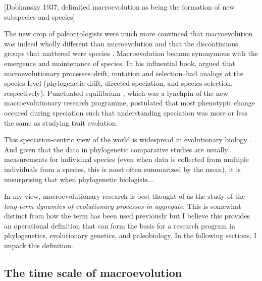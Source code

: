 [Dobhansky 1937, delimited macroevolution as being the formation of new subspecies and species]

The new crop of paleontologists were much more convinced that macroevolution was indeed wholly different than microevolution and that the discontinuous groups that mattered were species \citep{Stanley1975, Stanley1979, Gould1980, EldredgeCracraft1980, LiebermanTREE}. Macroevolution became synonymous with the emergence and maintenance of species. In his influential book, \citet{Stanley1979} argued that microevolutionary processes--drift, mutation and selection--had analogs at the species level (phylogenetic drift, directed speciation, and species selection, respectively). Punctuated equilibrium \citep{Eldredge1971, EldredgeGould1972, GouldEldredge1977}, which was a lynchpin of the new macroevolutionary research programme, postulated that most phenotypic change occured during speciation such that understanding speciation was more or less the same as studying trait evolution.

This speciation-centric view of the world is widespread in evolutionary biology \citep{Saetre2013}. And given that the data in phylogenetic comparative studies are usually measurements for individual species (even when data is collected from multiple individuals from a species, this is most often summarized by the mean), it is unsurprising that when phylogenetic biologists...

In my view, macroevolutionary research is best thought of as the study of the \emph{long-term dynamics of evolutionary processes in aggregate}.
This is somewhat distinct from how the term has been used previously but I believe this provides an operational definition that can form the basis for a research program in phylogenetics, evolutionary genetics, and paleobiology. In the following sections, I unpack this definition.

\subsection{The time scale of macroevolution}


